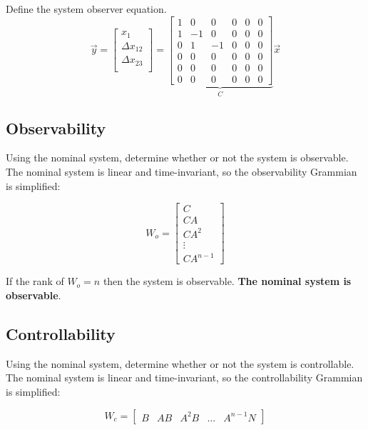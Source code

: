 \documentclass[12pt,onecolumn,reqno]{amsart}
\begin{document}
Define the system observer equation.
\begin{equation}
  \vec{y} = 
  \begin{bmatrix}
    x_{1}             \\
    \Delta x_{12}     \\
    \Delta x_{23}     \\
  \end{bmatrix}
  =
  \underbrace{
  \begin{bmatrix}
    1 & 0 & 0 & 0 & 0 & 0   \\
    1 & -1 & 0 & 0 & 0 & 0  \\
    0 & 1 & -1 & 0 & 0 & 0  \\
    0 & 0 & 0 & 0 & 0 & 0   \\
    0 & 0 & 0 & 0 & 0 & 0   \\
    0 & 0 & 0 & 0 & 0 & 0  
  \end{bmatrix}
  }_{C}
  \vec{x}
\end{equation}

\subsection{Observability}
Using the nominal system, determine whether or not the system is observable. The
nominal system is linear and time-invariant, so the observability Grammian is
simplified:

\begin{equation}
  W_{o} = 
  \begin{bmatrix}
    C      \\
    CA     \\
    CA^2   \\
    \vdots \\
    CA^{n-1}
  \end{bmatrix}
\end{equation}

If the rank of $W_{o} = n$ then the system is observable. \textbf{The nominal
system is observable}.


\subsection{Controllability}
Using the nominal system, determine whether or not the system is controllable. The
nominal system is linear and time-invariant, so the controllability Grammian is
simplified:

\begin{equation}
  W_{c} = 
  \begin{bmatrix}
    B & AB & A^2B & \hdots & A^{n-1}N
  \end{bmatrix}
\end{equation}
\end{document}
